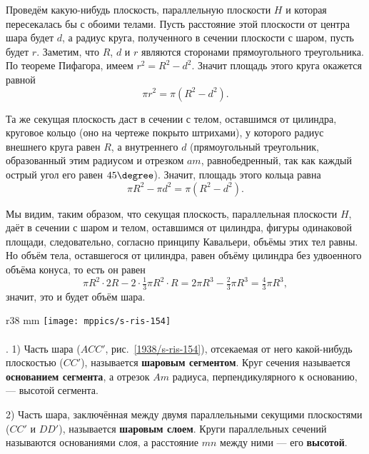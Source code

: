 Проведём какую-нибудь плоскость, параллельную плоскости $H$ и которая пересекалась бы с обоими телами.
Пусть расстояние этой плоскости от центра шара будет $d$, а радиус круга, полученного в сечении плоскости с шаром, пусть будет $r$.
Заметим, что $R$, $d$ и $r$ являются сторонами прямоугольного треугольника.
По теореме Пифагора, имеем $r^2=R^2-d^2$.
Значит площадь этого круга окажется равной 
\[\pi r^2 = \pi (R^2 - d^2).\]

Та же секущая плоскость даст в сечении с телом, оставшимся от цилиндра, круговое кольцо (оно на чертеже покрыто штрихами), у которого радиус внешнего круга равен $R$, а внутреннего $d$ (прямоугольный треугольник, образованный этим радиусом и отрезком $am$, равнобедренный, так как каждый острый угол его равен $45\degree$).
Значит, площадь этого кольца равна 
\[\pi R^2 - \pi d^2 = \pi(R^2 - d^2).\]

Мы видим, таким образом, что секущая плоскость, параллельная плоскости $H$, даёт в сечении с шаром и телом, оставшимся от цилиндра, фигуры одинаковой площади, следовательно, согласно принципу Кавальери, объёмы этих тел равны.
Но объём тела, оставшегося от цилиндра, равен объёму цилиндра без удвоенного объёма конуса, то есть он равен
\[\pi R^2\cdot 2R - 2 \cdot \tfrac13\pi R^2\cdot R = 2\pi R^3 - \tfrac23\pi R^3 = \tfrac43\pi R^3,\]
значит, это и будет объём шара.

\begin{wrapfigure}{r}{38 mm}
\vskip-0mm
\centering
\texttt{[image: mppics/s-ris-154]}
\caption{}\label{1938/s-ris-154}
\vskip-0mm
\end{wrapfigure}

\paragraph{}\label{1938/s148}
\mbox{.}
1) Часть шара ($ACC'$, рис.~\ref{1938/s-ris-154}), отсекаемая от него какой-нибудь плоскостью ($CC'$), называется \textbf{шаровым сегментом}.
Круг сечения называется \textbf{основанием сегмента}, а отрезок $Am$ радиуса, перпендикулярного к основанию, — высотой сегмента.

2) Часть шара, заключённая между двумя параллельными секущими плоскостями ($CC'$ и $DD'$), называется \textbf{шаровым слоем}.
Круги параллельных сечений называются основаниями слоя, а расстояние $mn$ между ними — его \textbf{высотой}.

